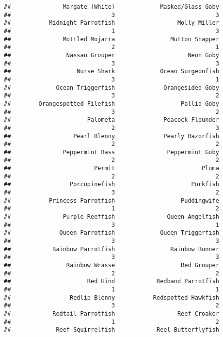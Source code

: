 \documentclass[
]{article}
\begin{document}
\begin{verbatim}
##               Margate (White)             Masked/Glass Goby 
##                             3                             3 
##           Midnight Parrotfish                  Molly Miller 
##                             1                             3 
##               Mottled Mojarra                Mutton Snapper 
##                             2                             1 
##                Nassau Grouper                     Neon Goby 
##                             3                             3 
##                   Nurse Shark             Ocean Surgeonfish 
##                             3                             1 
##             Ocean Triggerfish              Orangesided Goby 
##                             3                             2 
##        Orangespotted Filefish                   Pallid Goby 
##                             3                             2 
##                      Palometa              Peacock Flounder 
##                             2                             3 
##                  Pearl Blenny              Pearly Razorfish 
##                             2                             2 
##               Peppermint Bass               Peppermint Goby 
##                             2                             2 
##                        Permit                         Pluma 
##                             2                             2 
##                 Porcupinefish                      Porkfish 
##                             3                             2 
##           Princess Parrotfish                   Puddingwife 
##                             1                             2 
##               Purple Reeffish               Queen Angelfish 
##                             3                             1 
##              Queen Parrotfish             Queen Triggerfish 
##                             3                             3 
##            Rainbow Parrotfish                Rainbow Runner 
##                             3                             3 
##                Rainbow Wrasse                   Red Grouper 
##                             2                             2 
##                      Red Hind            Redband Parrotfish 
##                             1                             1 
##                 Redlip Blenny           Redspotted Hawkfish 
##                             3                             2 
##            Redtail Parrotfish                  Reef Croaker 
##                             1                             2 
##             Reef Squirrelfish            Reel Butterflyfish 

\end{verbatim}
\end{document}
